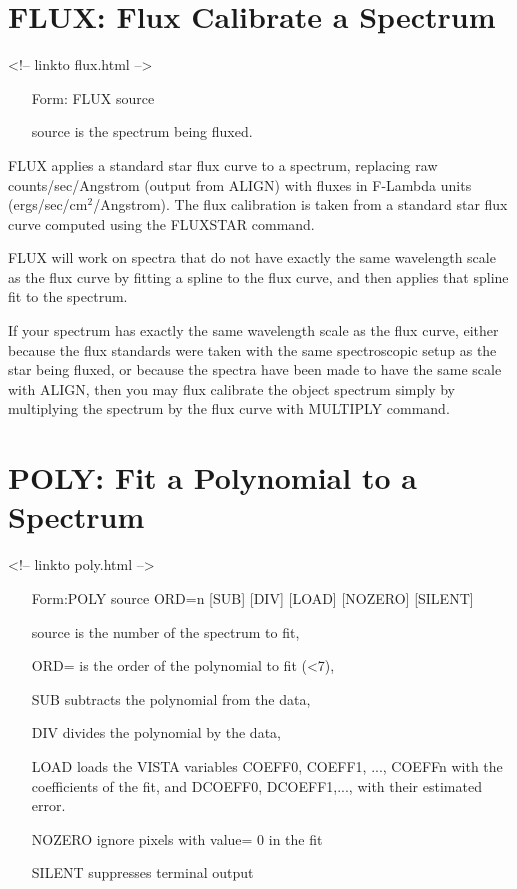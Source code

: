 \section{FLUX: Flux Calibrate a Spectrum}
\begin{rawhtml}
<!-- linkto flux.html -->
\end{rawhtml}
\begin{itemize}
  \item[Form: FLUX source\hfill]{}
  \item[source]{is the spectrum being fluxed.}
\end{itemize}

FLUX applies a standard star flux curve to a spectrum, replacing raw
counts/sec/Angstrom (output from ALIGN) with fluxes in F-Lambda units
(ergs/sec/cm$^2$/Angstrom).  The flux calibration is taken from a standard
star flux curve computed using the FLUXSTAR command.  

FLUX will work on spectra that do not have exactly the same wavelength
scale as the flux curve by fitting a spline to the flux curve, and then
applies that spline fit to the spectrum.

If your spectrum has exactly the same wavelength scale as the flux curve,
either because the flux standards were taken with the same spectroscopic
setup as the star being fluxed, or because the spectra have been made to
have the same scale with ALIGN, then you may flux calibrate the object
spectrum simply by multiplying the spectrum by the flux curve with MULTIPLY
command.

\section{POLY: Fit a Polynomial to a Spectrum}
\begin{rawhtml}
<!-- linkto poly.html -->
\end{rawhtml}
\begin{itemize}
  \item[Form:POLY source ORD=n {[SUB]} {[DIV]} {[LOAD]} {[NOZERO]} 
       {[SILENT]}\hfill]{}
  \item[source]{is the number of the spectrum to fit,}
  \item[ORD=]{is the order of the polynomial to fit (<7),}
  \item[SUB]{subtracts the polynomial from the data,}
  \item[DIV]{divides the polynomial by the data,}
  \item[LOAD]{loads the VISTA variables COEFF0, COEFF1, ...,
       COEFFn with the coefficients of the fit, and
       DCOEFF0, DCOEFF1,..., with their estimated error.}
  \item[NOZERO]{ignore pixels with value= 0 in the fit}
  \item[SILENT]{suppresses terminal output}
\end{itemize}

